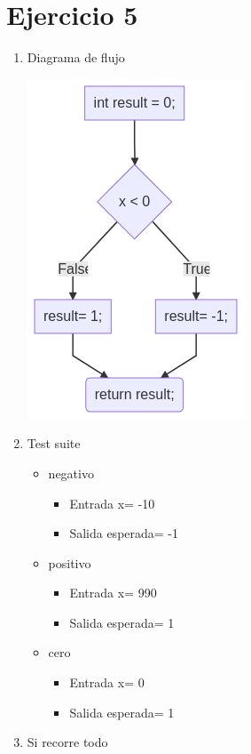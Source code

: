 \documentclass{article}
\begin{document}
\section*{Ejercicio 5}

\begin{enumerate}
    \item Diagrama de flujo
    
    \includegraphics[scale=0.65]{recursos/signo.png}

    \item Test suite
        \begin{itemize}
            \item negativo
                \begin{itemize}
                    \item Entrada x= -10
                    \item Salida esperada= -1
                \end{itemize}
            \item positivo
                \begin{itemize}
                    \item Entrada x= 990
                    \item Salida esperada= 1
                \end{itemize}
            \item cero
                \begin{itemize}
                    \item Entrada x= 0
                    \item Salida esperada= 1
                \end{itemize}
        \end{itemize}

    \item Si recorre todo
\end{enumerate}
\end{document}
